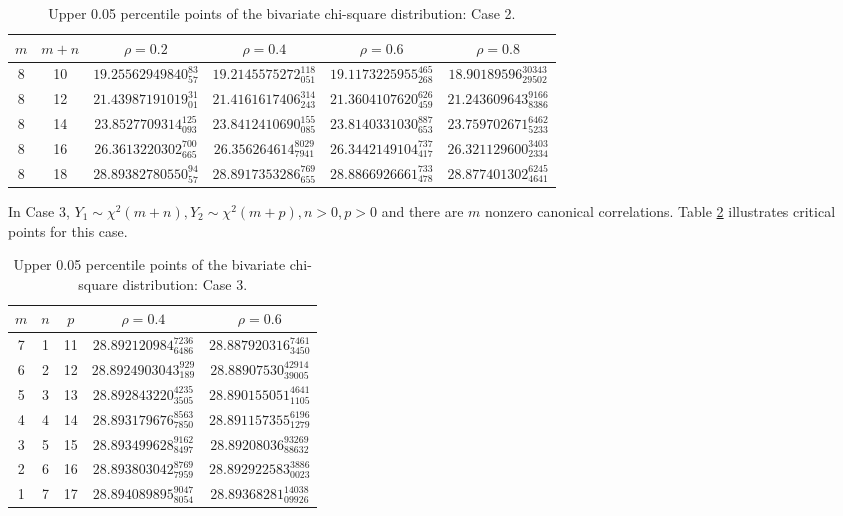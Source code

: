 \documentclass[10pt,letterpaper]{article}
\begin{document}
\begin{table}[ht]
\caption{Upper 0.05 percentile points of the bivariate chi-square distribution:
Case 2.}
\label{case2:05}
\begin{center}
\begin{tabular}{cccccc} \hline
$ m $ & $m+n$ & $\rho=0.2$ & $\rho=0.4$ & $\rho=0.6$ &  $\rho=0.8$  \\ \hline
8 & 10 & $19.25562949840_{57}^{83}$ & $19.2145575272_{051}^{118}$ & $19.1173225955_{268}^{465}$ & $18.90189596_{29502}^{30343}$\\ 
8 & 12 & $21.43987191019_{01}^{31}$ & $21.4161617406_{243}^{314}$  & $21.3604107620_{459}^{626}$ & $21.243609643_{8386}^{9166}$\\
8 & 14 & $23.8527709314_{093}^{125}$ & $23.8412410690_{085}^{155}$ & $23.8140331030_{653}^{887}$ & $23.759702671_{5233}^{6462}$\\
8 & 16 & $26.3613220302_{665}^{700}$ & $26.356264614_{7941}^{8029}$ & $26.3442149104_{417}^{737}$ & $26.321129600_{2334}^{3403}$\\
8 & 18 & $28.89382780550_{57}^{94}$ & $28.8917353286_{655}^{769}$ & $28.8866926661_{478}^{733}$ & $28.877401302_{4641}^{6245}$ \\
\hline
\end{tabular}
\end{center}
\end{table}
\renewcommand{\arraystretch}{1}
In Case 3, $Y_1 \sim \chi^2(m+n), Y_2 \sim \chi^2(m+p), n > 0,p > 0$ 
and there are $m$ nonzero canonical correlations.  Table \ref{case3:05}
illustrates critical points for this case.
\renewcommand{\arraystretch}{1.3}
\begin{table}[ht]
\caption{Upper 0.05 percentile points of the bivariate chi-square distribution:
Case 3.}
\label{case3:05}
\begin{center}
\begin{tabular}{ccccc} \hline
$m$ & $n$  & $p$ & $\rho=0.4$ & $\rho=0.6$ \\ \hline
7   & 1      & 11    & $28.892120984_{6486}^{7236} $ & $28.887920316_{3450}^{7461} $ \\
6   & 2      & 12    & $28.8924903043_{189}^{929}  $ & $28.88907530_{39005}^{42914} $ \\
5   & 3      & 13    & $28.892843220_{3505}^{4235} $ & $28.890155051_{1105}^{4641} $ \\
4   & 4      & 14    & $28.893179676_{7850}^{8563} $ & $28.891157355_{1279}^{6196} $ \\
3   & 5      & 15    & $28.893499628_{8497}^{9162} $ & $28.89208036_{88632}^{93269} $ \\
2   & 6      & 16    & $28.893803042_{7959}^{8769} $ & $28.892922583_{0023}^{3886} $ \\
1   & 7      & 17    & $28.894089895_{8054}^{9047} $ &
$28.89368281_{09926}^{14038} $ \\ \hline
\end{tabular}
\end{center}
\end{table}
\renewcommand{\arraystretch}{1}
\end{document}
